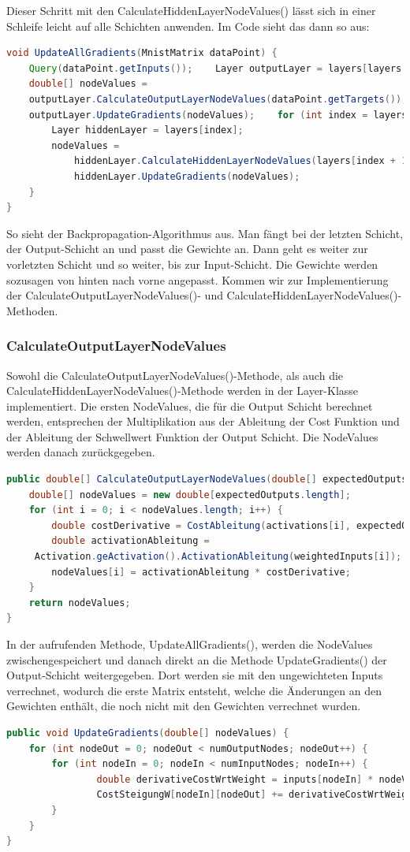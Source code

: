 \documentclass[12pt]{article}
\begin{document}
Dieser Schritt mit den CalculateHiddenLayerNodeValues() lässt sich in einer Schleife leicht auf alle Schichten anwenden. Im Code sieht das dann so aus:\begin{lstlisting}[language=Java]
void UpdateAllGradients(MnistMatrix dataPoint) {
    Query(dataPoint.getInputs());    Layer outputLayer = layers[layers.length - 1];
    double[] nodeValues = 
    outputLayer.CalculateOutputLayerNodeValues(dataPoint.getTargets());
    outputLayer.UpdateGradients(nodeValues);    for (int index = layers.length - 2; index >= 0; index--) {
        Layer hiddenLayer = layers[index];
        nodeValues = 
            hiddenLayer.CalculateHiddenLayerNodeValues(layers[index + 1], nodeValues);
            hiddenLayer.UpdateGradients(nodeValues);
    }
}
\end{lstlisting}
So sieht der Backpropagation-Algorithmus aus. Man fängt bei der letzten Schicht, der Output-Schicht an und passt die Gewichte an. Dann geht es weiter zur vorletzten Schicht und so weiter, bis zur Input-Schicht. Die Gewichte werden sozusagen von hinten nach vorne angepasst.
Kommen wir zur Implementierung der CalculateOutputLayerNodeValues()- und CalculateHiddenLayerNodeValues()-Methoden.\subsubsection{CalculateOutputLayerNodeValues}Sowohl die CalculateOutputLayerNodeValues()-Methode, als auch die CalculateHiddenLayerNodeValues()-Methode werden in der Layer-Klasse implementiert.
Die ersten NodeValues, die für die Output Schicht berechnet werden, entsprechen der Multiplikation aus der Ableitung der Cost Funktion und der Ableitung der Schwellwert Funktion der Output Schicht.
Die NodeValues werden danach zurückgegeben.\begin{lstlisting}[language=Java]
public double[] CalculateOutputLayerNodeValues(double[] expectedOutputs) {
    double[] nodeValues = new double[expectedOutputs.length];
    for (int i = 0; i < nodeValues.length; i++) {
        double costDerivative = CostAbleitung(activations[i], expectedOutputs[i]);
        double activationAbleitung = 
     Activation.geActivation().ActivationAbleitung(weightedInputs[i]);
        nodeValues[i] = activationAbleitung * costDerivative;
    }
    return nodeValues;
}
\end{lstlisting}
In der aufrufenden Methode, UpdateAllGradients(), werden die NodeValues zwischengespeichert und danach direkt an die Methode UpdateGradients() der Output-Schicht weitergegeben. Dort werden sie mit den ungewichteten Inputs verrechnet, wodurch die erste Matrix entsteht, welche die Änderungen an den Gewichten enthält, die noch nicht mit den Gewichten verrechnet wurden.\begin{lstlisting}[language=Java]
public void UpdateGradients(double[] nodeValues) {
    for (int nodeOut = 0; nodeOut < numOutputNodes; nodeOut++) {
        for (int nodeIn = 0; nodeIn < numInputNodes; nodeIn++) {
	            double derivativeCostWrtWeight = inputs[nodeIn] * nodeValues[nodeOut];
	            CostSteigungW[nodeIn][nodeOut] += derivativeCostWrtWeight;
        }
    }
}
\end{lstlisting}
\end{document}
